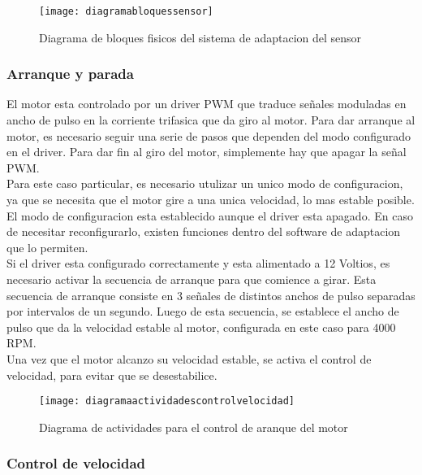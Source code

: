 \begin{figure}[h]
  \centering
  \texttt{[image: diagramabloquessensor]}
  \caption{Diagrama de bloques fisicos del sistema de adaptacion del sensor}\label{fig:diagramabloquessensor}
\end{figure}

\subsubsection{Arranque y parada} %
\label{it6:ssub:arranque_y_parada}

El motor esta controlado por un driver PWM que traduce señales moduladas en ancho de pulso en la corriente trifasica que da giro al motor. Para dar arranque al motor, es necesario seguir una serie de pasos que dependen del modo configurado en el driver. Para dar fin al giro del motor, simplemente hay que apagar la señal PWM. \\

Para este caso particular, es necesario utulizar un unico modo de configuracion, ya que se necesita que el motor gire a una unica velocidad, lo mas estable posible. El modo de configuracion esta establecido aunque el driver esta apagado. En caso de necesitar reconfigurarlo, existen funciones dentro del software de adaptacion que lo permiten. \\

Si el driver esta configurado correctamente y esta alimentado a 12 Voltios, es necesario activar la secuencia de arranque para que comience a girar. Esta secuencia de arranque consiste en 3 señales de distintos anchos de pulso separadas por intervalos de un segundo. Luego de esta secuencia, se establece el ancho de pulso que da la velocidad estable al motor, configurada en este caso para 4000 RPM. \\

Una vez que el motor alcanzo su velocidad estable, se activa el control de velocidad, para evitar que se desestabilice. 

\begin{figure}[h]
  \centering
  \texttt{[image: diagramaactividadescontrolvelocidad]}
  \caption{Diagrama de actividades para el control de aranque del motor}\label{fig:diagramaactividadesarrancarmotor}
\end{figure}


\subsubsection{Control de velocidad} %
\label{it6:ssub:control_de_velocidad}

